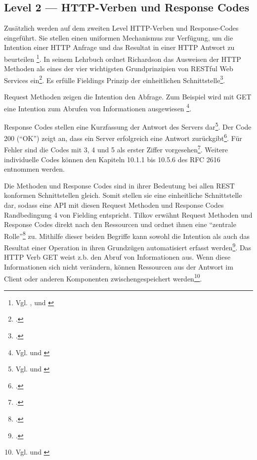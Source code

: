 \subsection{Level 2 — HTTP-Verben und Response Codes}\label{subsection:level-2}

Zusätzlich werden auf dem zweiten Level HTTP-Verben und Response-Codes eingeführt. Sie stellen einen uniformen Mechanismus zur Verfügung, um die Intention einer HTTP Anfrage und das Resultat in einer HTTP Antwort zu beurteilen \footnote{Vgl. \cite[S. 15]{haupt_conversation_2015}, \cite[S. 237]{franch_detection_2014} und \cite[S. 23]{masse_rest_2012}}. In seinem Lehrbuch ordnet Richardson das Ausweisen der HTTP Methoden als eines der vier wichtigsten Grundprinzipien von RESTful Web Services ein\footcite[Vgl. ][S. 105]{richardson_restful_2007}. Es erfülle Fieldings Prinzip der einheitlichen Schnittstelle\footcite[Vgl. ][S. 79]{richardson_restful_2007}.

Request Methoden zeigen die Intention den Abfrage. Zum Beispiel wird mit GET eine Intention zum Abrufen von Informationen ausgewiesen \footnote{Vgl. \cite[S. 6]{richardson_restful_2007} und \cite[S. 28]{masse_rest_2012}}.

Response Codes stellen eine Kurzfassung der Antwort des Servers dar\footnote{Vgl. \cite[S. 237]{franch_detection_2014} und \cite[S. 28]{masse_rest_2012}}. Der Code 200 (“OK”) zeigt an, dass ein Server erfolgreich eine Antwort zurückgibt\footcite[Vgl. ][S. 137]{richardson_restful_2007}. Für Fehler sind die Codes mit 3, 4 und 5 als erster Ziffer vorgesehen\footcite[Vgl. ][S. 139]{richardson_restful_2007}. Weitere individuelle Codes können den Kapiteln 10.1.1 bis 10.5.6 des RFC 2616 entnommen werden. 

Die Methoden und Response Codes sind in ihrer Bedeutung bei allen REST konformen Schnittstellen gleich. Somit stellen sie eine einheitliche Schnittstelle dar, sodass eine API mit diesen Request Methoden und Response Codes Randbedingung 4 von Fielding entspricht. Tilkov erwähnt Request Methoden und Response Codes direkt nach den Ressourcen und ordnet ihnen eine “zentrale Rolle”\footcite[Vgl. ][S. 53]{tilkov_rest_2015} zu. Mithilfe dieser beiden Begriffe kann sowohl die Intention als auch das Resultat einer Operation in ihren Grundzügen automatisiert erfasst werden\footcite[Vgl. ][S. 36]{richardson_restful_2013}. Das HTTP Verb GET weist z.b. den Abruf von Informationen aus. Wenn diese Informationen sich nicht verändern, können Ressourcen aus der Antwort im Client oder anderen Komponenten zwischengespeichert werden\footnote{Vgl. \cite{fowler_richardson_2010} und \cite[S. 219]{richardson_restful_2007}}.

